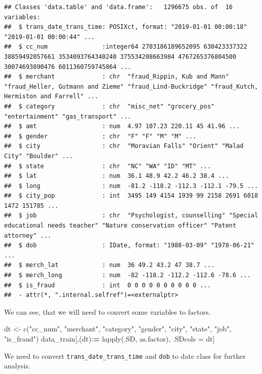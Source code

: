 \documentclass[
]{report}
\newenvironment{Shaded}{\begin{snugshade}}{\end{snugshade}}
\newcommand{\ErrorTok}[1]{\textcolor[rgb]{0.64,0.00,0.00}{\textbf{#1}}}
\newcommand{\FunctionTok}[1]{\textcolor[rgb]{0.00,0.00,0.00}{#1}}
\newcommand{\NormalTok}[1]{#1}
\newcommand{\OtherTok}[1]{\textcolor[rgb]{0.56,0.35,0.01}{#1}}
\newcommand{\SpecialCharTok}[1]{\textcolor[rgb]{0.00,0.00,0.00}{#1}}
\newcommand{\StringTok}[1]{\textcolor[rgb]{0.31,0.60,0.02}{#1}}
\begin{document}
\begin{verbatim}
## Classes 'data.table' and 'data.frame':   1296675 obs. of  16 variables:
##  $ trans_date_trans_time: POSIXct, format: "2019-01-01 00:00:18" "2019-01-01 00:00:44" ...
##  $ cc_num               :integer64 2703186189652095 630423337322 38859492057661 3534093764340240 375534208663984 4767265376804500 30074693890476 6011360759745864 ... 
##  $ merchant             : chr  "fraud_Rippin, Kub and Mann" "fraud_Heller, Gutmann and Zieme" "fraud_Lind-Buckridge" "fraud_Kutch, Hermiston and Farrell" ...
##  $ category             : chr  "misc_net" "grocery_pos" "entertainment" "gas_transport" ...
##  $ amt                  : num  4.97 107.23 220.11 45 41.96 ...
##  $ gender               : chr  "F" "F" "M" "M" ...
##  $ city                 : chr  "Moravian Falls" "Orient" "Malad City" "Boulder" ...
##  $ state                : chr  "NC" "WA" "ID" "MT" ...
##  $ lat                  : num  36.1 48.9 42.2 46.2 38.4 ...
##  $ long                 : num  -81.2 -118.2 -112.3 -112.1 -79.5 ...
##  $ city_pop             : int  3495 149 4154 1939 99 2158 2691 6018 1472 151785 ...
##  $ job                  : chr  "Psychologist, counselling" "Special educational needs teacher" "Nature conservation officer" "Patent attorney" ...
##  $ dob                  : IDate, format: "1988-03-09" "1978-06-21" ...
##  $ merch_lat            : num  36 49.2 43.2 47 38.7 ...
##  $ merch_long           : num  -82 -118.2 -112.2 -112.6 -78.6 ...
##  $ is_fraud             : int  0 0 0 0 0 0 0 0 0 0 ...
##  - attr(*, ".internal.selfref")=<externalptr>
\end{verbatim}

We can see, that we will need to convert some variables to factors.

\begin{Shaded}
\begin{Highlighting}[]
\NormalTok{dt }\OtherTok{\textless{}{-}} \FunctionTok{c}\NormalTok{(}\StringTok{"cc\_num"}\NormalTok{, }\StringTok{"merchant"}\NormalTok{, }\StringTok{"category"}\NormalTok{, }\StringTok{"gender"}\NormalTok{, }\StringTok{"city"}\NormalTok{, }\StringTok{"state"}\NormalTok{, }\StringTok{"job"}\NormalTok{, }\StringTok{"is\_fraud"}\NormalTok{)}
\NormalTok{data\_train[,(dt)}\SpecialCharTok{:}\ErrorTok{=} \FunctionTok{lapply}\NormalTok{(.SD, as.factor), .SDcols }\OtherTok{=}\NormalTok{ dt]}
\end{Highlighting}
\end{Shaded}

We need to convert \texttt{trans\_date\_trans\_time} and \texttt{dob} to
date class for further analysis.
\end{document}
